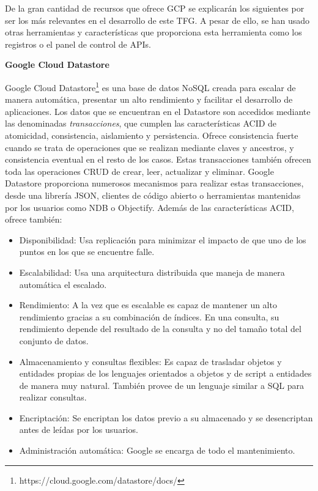 De la gran cantidad de recursos que ofrece \acs{GCP} se explicarán los siguientes por ser los más relevantes en el desarrollo de este \ac{TFG}. A pesar de ello, se han usado otras herramientas y características que proporciona esta herramienta como los registros o el panel de control de \acs{API}s.

\textbf{Google Cloud Datastore}

Google Cloud Datastore\footnote{https://cloud.google.com/datastore/docs/} es una base de datos NoSQL creada para escalar de manera automática, presentar un alto rendimiento y facilitar el desarrollo de aplicaciones. Los datos que se encuentran en el Datastore son accedidos mediante las denominadas \textit{transacciones}, que cumplen las características \acs{ACID} de atomicidad, consistencia, aislamiento y persistencia. Ofrece consistencia fuerte cuando se trata de operaciones que se realizan mediante claves y ancestros, y consistencia eventual en el resto de los casos. Estas transacciones también ofrecen toda las operaciones \acs{CRUD} de crear, leer, actualizar y eliminar. Google Datastore proporciona numerosos mecanismos para realizar estas transacciones, desde una librería JSON, clientes de código abierto o herramientas mantenidas por los usuarios como NDB o Objectify. Además de las características \acs{ACID}, ofrece también:

\begin{itemize}
\item Disponibilidad: Usa replicación para minimizar el impacto de que uno de los puntos en los que se encuentre falle.
\item Escalabilidad: Usa una arquitectura distribuida que maneja de manera automática el escalado.
\item Rendimiento: A la vez que es escalable es capaz de mantener un alto rendimiento gracias a su combinación de índices. En una consulta, su rendimiento depende del resultado de la consulta y no del tamaño total del conjunto de datos.
\item Almacenamiento y consultas flexibles: Es capaz de trasladar objetos y entidades propias de los lenguajes orientados a objetos y de script a entidades de manera muy natural. También provee de un lenguaje similar a SQL para realizar consultas.
\item Encriptación: Se encriptan los datos previo a su almacenado y se desencriptan antes de leídas por los usuarios.
\item Administración automática: Google se encarga de todo el mantenimiento.
\end{itemize} 

